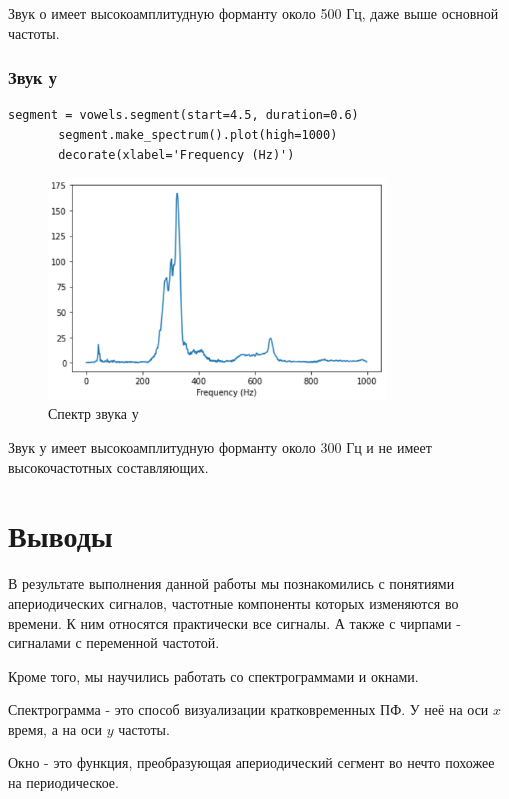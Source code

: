 \documentclass[a4paper,12pt]{report}
\begin{document}
    Звук о имеет высокоамплитудную форманту около 500 Гц, даже выше основной частоты.

\subsection{Звук у}
\begin{lstlisting}[caption=Получение спектра звука у]
       segment = vowels.segment(start=4.5, duration=0.6)
       segment.make_spectrum().plot(high=1000)
       decorate(xlabel='Frequency (Hz)')
\end{lstlisting}
\begin{figure}[H]
        \centering
        \includegraphics[width=0.8\textwidth]{fig6-6.PNG}
        \caption{Спектр звука у}
        \label{fig:fig6-6}
\end{figure}

    Звук у имеет высокоамплитудную форманту около 300 Гц и не имеет высокочастотных составляющих.
\chapter{Выводы}
    В результате выполнения данной работы мы познакомились с понятиями апериодических сигналов, частотные компоненты которых изменяются во времени. К ним относятся практически все сигналы. А также с чирпами - сигналами с переменной частотой.
    
    Кроме того, мы научились работать со спектрограммами и окнами. 
    
    Спектрограмма - это способ визуализации кратковременных ПФ. У неё на оси $x$ время, а на оси $y$ частоты.
    
    Окно - это функция, преобразующая апериодический сегмент во нечто похожее на периодическое.   
\end{document}
